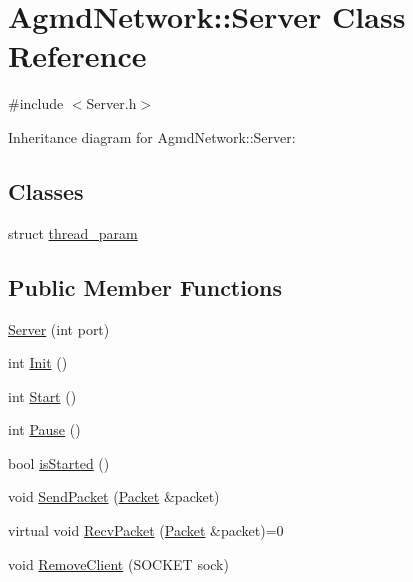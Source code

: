 \hypertarget{class_agmd_network_1_1_server}{\section{Agmd\+Network\+:\+:Server Class Reference}
\label{class_agmd_network_1_1_server}
}


{\ttfamily \#include $<$Server.\+h$>$}



Inheritance diagram for Agmd\+Network\+:\+:Server\+:
\subsection*{Classes}
\begin{DoxyCompactItemize}
\item 
struct \hyperlink{struct_agmd_network_1_1_server_1_1thread__param}{thread\+\_\+param}
\end{DoxyCompactItemize}
\subsection*{Public Member Functions}
\begin{DoxyCompactItemize}
\item 
\hyperlink{class_agmd_network_1_1_server_abe7fee464a83053160a5fa3582edbe0e}{Server} (int port)
\item 
int \hyperlink{class_agmd_network_1_1_server_aaa22556f45862d01defd56405fb3f8f9}{Init} ()
\item 
int \hyperlink{class_agmd_network_1_1_server_ab2ae12e4bc684bb19eba1601bb6a90d5}{Start} ()
\item 
int \hyperlink{class_agmd_network_1_1_server_ae406babf7e440f99f010d60c95f29a8b}{Pause} ()
\item 
bool \hyperlink{class_agmd_network_1_1_server_a5413800e8d5dd1b5483f910c6163d5e7}{is\+Started} ()
\item 
void \hyperlink{class_agmd_network_1_1_server_a7144d57c804d9a4aa5dae4d83011d1b0}{Send\+Packet} (\hyperlink{class_agmd_network_1_1_packet}{Packet} \&packet)
\item 
virtual void \hyperlink{class_agmd_network_1_1_server_afb8e79ab1d6e342cbdd301ae60fd185d}{Recv\+Packet} (\hyperlink{class_agmd_network_1_1_packet}{Packet} \&packet)=0
\item 
void \hyperlink{class_agmd_network_1_1_server_aa462f1e230f1d3961db3f847703ecc34}{Remove\+Client} (S\+O\+C\+K\+E\+T sock)
\end{DoxyCompactItemize}
